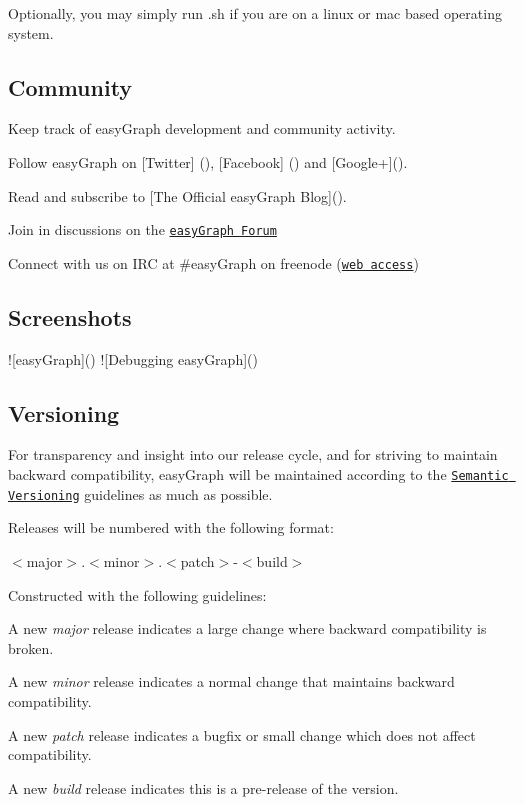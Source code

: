 Optionally, you may simply run {\ttfamily .sh} if you are on a linux or mac based operating system.

\label{_community}%
 \subsection*{Community}

Keep track of easy\+Graph development and community activity.


\begin{DoxyItemize}
\item Follow easy\+Graph on \mbox{[}Twitter\mbox{]} (), \mbox{[}Facebook\mbox{]} () and \mbox{[}Google+\mbox{]}().
\item Read and subscribe to \mbox{[}The Official easy\+Graph Blog\mbox{]}().
\item Join in discussions on the \href{https://reddit.com/r/easyGraph/}{\tt easy\+Graph Forum}
\item Connect with us on I\+RC at {\ttfamily \#easy\+Graph} on freenode (\href{http://webchat.freenode.net/?channels=easyGraph}{\tt web access})
\end{DoxyItemize}

\subsection*{Screenshots}

!\mbox{[}easy\+Graph\mbox{]}() !\mbox{[}Debugging easy\+Graph\mbox{]}()

\subsection*{Versioning}

For transparency and insight into our release cycle, and for striving to maintain backward compatibility, easy\+Graph will be maintained according to the \href{http://semver.org/}{\tt Semantic Versioning} guidelines as much as possible.

Releases will be numbered with the following format\+:

{\ttfamily $<$major$>$.$<$minor$>$.$<$patch$>$-\/$<$build$>$}

Constructed with the following guidelines\+:


\begin{DoxyItemize}
\item A new {\itshape major} release indicates a large change where backward compatibility is broken.
\item A new {\itshape minor} release indicates a normal change that maintains backward compatibility.
\item A new {\itshape patch} release indicates a bugfix or small change which does not affect compatibility.
\item A new {\itshape build} release indicates this is a pre-\/release of the version.
\end{DoxyItemize}


